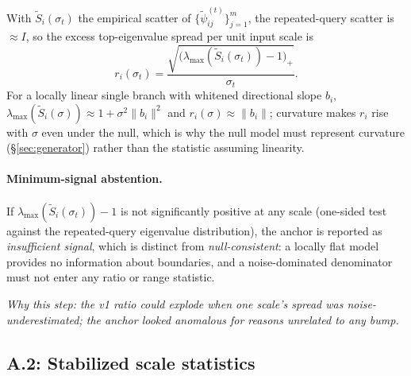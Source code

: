 \documentclass[11pt]{article}
\newcommand{\why}[1]{\par\noindent\textcolor{muted}{\small\itshape Why this step: #1}}
\begin{document}
With \(\tilde S_i(\sigma_t)\) the empirical scatter of
\(\{\tilde\psi_{ij}^{(t)}\}_{j=1}^m\), the repeated-query scatter is \(\approx I\), so the
excess top-eigenvalue spread per unit input scale is
\[
  r_i(\sigma_t)
  =
  \frac{\sqrt{\bigl(\lambda_{\max}(\tilde S_i(\sigma_t))-1\bigr)_+}}{\sigma_t}.
\]
For a locally linear single branch with whitened directional slope \(b_i\),
\(\lambda_{\max}(\tilde S_i(\sigma))\approx 1+\sigma^2\|b_i\|^2\) and
\(r_i(\sigma)\approx\|b_i\|\); curvature makes \(r_i\) rise with \(\sigma\) even under the
null, which is why the null model must represent curvature (\S\ref{sec:generator}) rather
than the statistic assuming linearity.

\paragraph{Minimum-signal abstention.}
If \(\lambda_{\max}(\tilde S_i(\sigma_t))-1\) is not significantly positive at any scale
(one-sided test against the repeated-query eigenvalue distribution), the anchor is reported as
\emph{insufficient signal}, which is distinct from \emph{null-consistent}: a locally flat
model provides no information about boundaries, and a noise-dominated denominator must not
enter any ratio or range statistic.
\why{the v1 ratio could explode when one scale's spread was noise-underestimated; the anchor
looked anomalous for reasons unrelated to any bump.}

\subsection{A.2: Stabilized scale statistics}
\label{sec:statistic}
\end{document}
